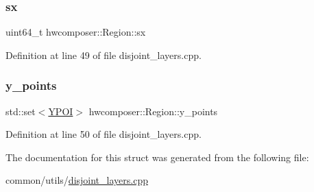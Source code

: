 \mbox{\label{structhwcomposer_1_1Region_aaebe8b3c84beac9b673e16da0538da00}} 
\subsubsection{\texorpdfstring{sx}{sx}}
{\footnotesize\ttfamily uint64\+\_\+t hwcomposer\+::\+Region\+::sx}



Definition at line 49 of file disjoint\+\_\+layers.\+cpp.

\mbox{\label{structhwcomposer_1_1Region_a4e531e0e48c6299ae312397c9d4eeea7}} 
\subsubsection{\texorpdfstring{y\+\_\+points}{y\_points}}
{\footnotesize\ttfamily std\+::set$<$\mbox{\hyperlink{structhwcomposer_1_1YPOI}{Y\+P\+OI}}$>$ hwcomposer\+::\+Region\+::y\+\_\+points}



Definition at line 50 of file disjoint\+\_\+layers.\+cpp.



The documentation for this struct was generated from the following file\+:\begin{DoxyCompactItemize}
\item 
common/utils/\mbox{\hyperlink{disjoint__layers_8cpp}{disjoint\+\_\+layers.\+cpp}}\end{DoxyCompactItemize}
